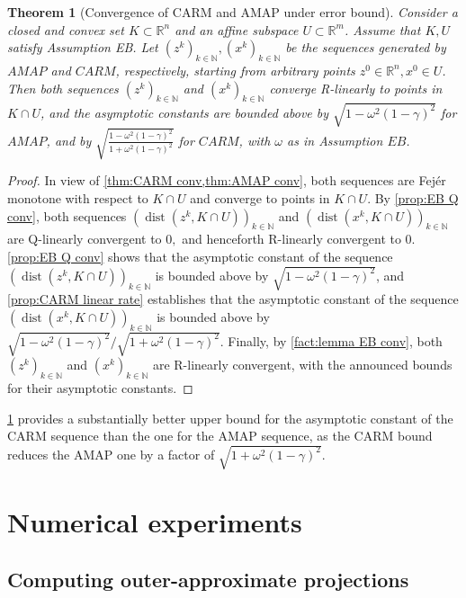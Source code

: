 \documentclass[smallextended,numbook,nospthms]{svjour3}
\theoremstyle{plain}
\newtheorem{theorem}{Theorem}[section]
\theoremstyle{definition}
\def\RR{\mathds R}
\def\NN{\mathds N}
\DeclareMathOperator{\dist}{dist}
\begin{document}
\begin{theorem}[Convergence of CARM and AMAP under error bound]\label{thm:CARM EB conv}
	Consider a closed and convex set $K \subset \RR^{n}$ and an affine subspace $U \subset \RR^{m}$. Assume that $K, U$ satisfy Assumption EB. Let $\left(z^{k}\right)_{k \in \NN},\left(x^{k}\right)_{k \in \NN}$ be the sequences generated by $AMAP$ and $CARM$, respectively, starting from arbitrary points $z^{0} \in \RR^{n}, x^{0} \in U$. Then both sequences $\left(z^{k}\right)_{k \in \NN}$ and $\left(x^{k}\right)_{k \in \NN}$
	converge R-linearly to points in $K \cap U$, and the asymptotic constants are bounded above by $\sqrt{1-\omega^{2}(1-\gamma)^{2}}$ for $AMAP$, and by $\sqrt{\frac{1-\omega^{2}(1-\gamma)^{2}}{1+\omega^{2}(1-\gamma)^{2}}}$ for $CARM$, with $\omega$ as in Assumption $EB$.
\end{theorem}
\begin{proof}
	In view of \cref{thm:CARM conv,thm:AMAP conv}, both sequences are Fejér monotone with respect to $K \cap U$ and converge to points in $K \cap U$. By \cref{prop:EB Q conv}, both sequences $\left(\dist\left(z^{k}, K \cap U\right)\right)_{k \in \NN}$ and $\left(\dist\left(x^{k}, K \cap U\right)\right)_{k \in \NN}$ are Q-linearly convergent to $0,$ and henceforth R-linearly convergent to 0. 
	\cref{prop:EB Q conv} shows that the asymptotic constant of the sequence $\left(\dist\left(z^{k}, K \cap U\right)\right)_{k \in \NN}$ is bounded above by $\sqrt{1-\omega^{2}(1-\gamma)^{2}}$, and \cref{prop:CARM linear rate} establishes that the asymptotic constant of the sequence $\left(\dist\left(x^{k}, K \cap U\right)\right)_{k \in \NN}$ is bounded above by $\sqrt{1-\omega^{2}(1-\gamma)^{2}} / \sqrt{1+\omega^{2}(1-\gamma)^{2}}$. Finally, by \cref{fact:lemma EB conv}, both $\left(z^{k}\right)_{k \in \NN}$ and $\left(x^{k}\right)_{k \in \NN}$ are R-linearly convergent, with the announced bounds for their asymptotic constants.
\end{proof}

\cref{thm:CARM EB conv} provides a substantially better upper bound for the asymptotic constant of the CARM sequence than the one for the AMAP sequence, as the CARM bound reduces the AMAP one by a factor of $\sqrt{1+\omega^{2}(1-\gamma)^2}$.

\newpage
\section{Numerical experiments}\label{sec:numerical}
\subsection{Computing outer-approximate projections}
\end{document}
